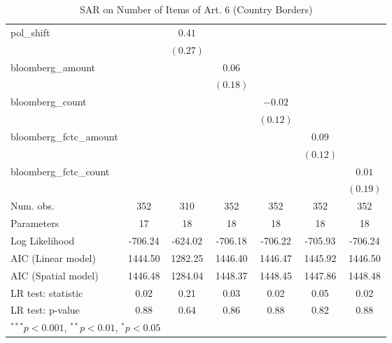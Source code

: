 \begin{table}[!h]
\begin{center}
\begin{tabular}{l c c c c c c }
pol\_shift              &              & $0.41$       &              &              &              &              \\
                        &              & $(0.27)$     &              &              &              &              \\
bloomberg\_amount       &              &              & $0.06$       &              &              &              \\
                        &              &              & $(0.18)$     &              &              &              \\
bloomberg\_count        &              &              &              & $-0.02$      &              &              \\
                        &              &              &              & $(0.12)$     &              &              \\
bloomberg\_fctc\_amount &              &              &              &              & $0.09$       &              \\
                        &              &              &              &              & $(0.12)$     &              \\
bloomberg\_fctc\_count  &              &              &              &              &              & $0.01$       \\
                        &              &              &              &              &              & $(0.19)$     \\
\midrule
Num. obs.               & 352          & 310          & 352          & 352          & 352          & 352          \\
Parameters              & 17           & 18           & 18           & 18           & 18           & 18           \\
Log Likelihood          & -706.24      & -624.02      & -706.18      & -706.22      & -705.93      & -706.24      \\
AIC (Linear model)      & 1444.50      & 1282.25      & 1446.40      & 1446.47      & 1445.92      & 1446.50      \\
AIC (Spatial model)     & 1446.48      & 1284.04      & 1448.37      & 1448.45      & 1447.86      & 1448.48      \\
LR test: statistic      & 0.02         & 0.21         & 0.03         & 0.02         & 0.05         & 0.02         \\
LR test: p-value        & 0.88         & 0.64         & 0.86         & 0.88         & 0.82         & 0.88         \\
\bottomrule
\multicolumn{7}{l}{\scriptsize{$^{***}p<0.001$, $^{**}p<0.01$, $^*p<0.05$}}
\end{tabular}
\caption{SAR on Number of Items of Art. 6 (Country Borders)}
\label{table:coefficients}
\end{center}
\end{table}
